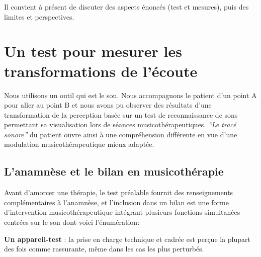 

Il convient à présent de discuter des aspects énoncés (test et
mesures),  puis des
limites et perspectives.
 
\section{Un test pour mesurer les trans\-for\-ma\-tions de l'écoute}

Nous utilisons un outil qui est le son. Nous accompagnons
le patient d'un point A pour aller au point B et 
nous avons pu observer des résultats
d'une transformation de la
perception basée sur un test de reconnaissance de sons permettant sa
visualisation lors de séances musicothérapeutiques.
\textit{``Le tracé sonore''} du patient ouvre ainsi à une compréhension
différente en vue d'une modulation musicothérapeutique mieux adaptée.

\subsection{L'anamnèse et le bilan en musicothérapie}

  Avant d'amorcer une thérapie, le test préalable fournit des
  renseignements
  complémentaires à l'anamnèse, et l'inclusion dans un bilan
  est  une forme d'intervention
   musicothérapeutique intégrant plusieurs fonctions simultanées
   centrées sur le son dont voici l'énumération:

   \textbf{Un appareil-test} : la  prise en charge 
   technique et cadrée est perçue la plupart des fois comme rassurante,
   même dans les cas les plus perturbés.


   
